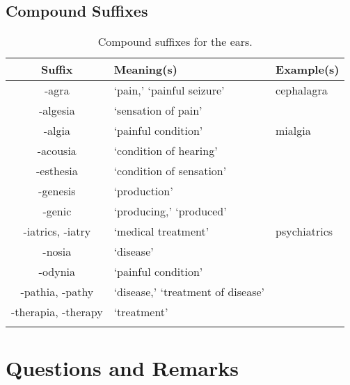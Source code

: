 \subsection{Compound Suffixes}

\begin{longtable}{c | p{} | p{}}
    \caption{Compound suffixes for the ears.}
    \hline
    Suffix & Meaning(s) & Example(s) \\ \hline
        -agra & `pain,' `painful seizure' & cephalagra \\
        -algesia & `sensation of pain' & \\
        -algia & `painful condition' & mialgia \\
        -acousia & `condition of hearing' & \\
        -esthesia & `condition of sensation' & \\
        -genesis & `production' & \\
        -genic & `producing,' `produced' & \\
        -iatrics, -iatry & `medical treatment' & psychiatrics \\
        -nosia & `disease' & \\
        -odynia & `painful condition' & \\
        -pathia, -pathy & `disease,' `treatment of disease' & \\
        -therapia, -therapy & `treatment' & \\
    \label{tab:Ch6Suffix2}
\end{longtable}


\section{Questions and Remarks}
\label{sec:QR6}






%
%
%


